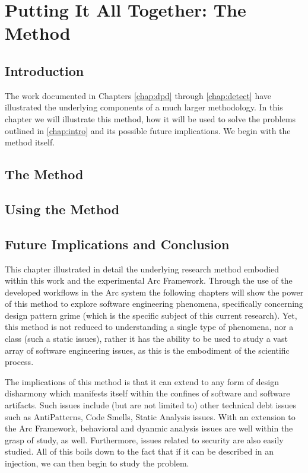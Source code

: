 \chapter{Putting It All Together: The Method}

\section{Introduction}
The work documented in Chapters \ref{chap:dpd} through \ref{chap:detect} have
illustrated the underlying components of a much larger methodology. In this
chapter we will illustrate this method, how it will be used to solve the
problems outlined in \ref{chap:intro} and its possible future implications. We
begin with the method itself.

\section{The Method}


\section{Using the Method}


\section{Future Implications and Conclusion}
This chapter illustrated in detail the underlying research method embodied
within this work and the experimental Arc Framework. Through the use of the
developed workflows in the Arc system the following chapters will show the power
of this method to explore software engineering phenomena, specifically
concerning design pattern grime (which is the specific subject of this current
research). Yet, this method is not reduced to understanding a single type of
phenomena, nor a class (such a static issues), rather it has the ability to be
used to study a vast array of software engineering issues, as this is the
embodiment of the scientific process.

The implications of this method is that it can extend to any form of design
disharmony which manifests itself within the confines of software and software
artifacts. Such issues include (but are not limited to) other technical debt
issues such as AntiPatterns, Code Smells, Static Analysis issues. With an
extension to the Arc Framework, behavioral and dyanmic analysis issues are well
within the grasp of study, as well. Furthermore, issues related to security are
also easily studied. All of this boils down to the fact that if it can be
described in an injection, we can then begin to study the problem.

